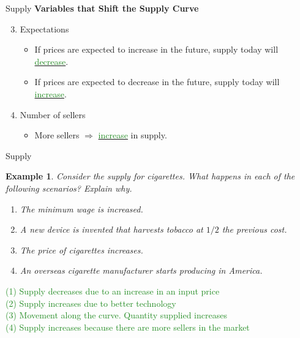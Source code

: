 \documentclass[xcolor={dvipsnames},pdf, hyperref={colorlinks=true, citecolor=ForestGreen, linkcolor=BlueViolet, urlcolor=Magenta}]{beamer}
\newtheorem{exmp}{Example}[section]
\theoremstyle{definition}
\newcommand{\ddp}[1]{{\textcolor{ForestGreen}{#1}}}
\newcommand{\dd}[1]{{\underline{\textcolor{ForestGreen}{#1}}}}
\begin{document}
\begin{frame}{Supply}
	\textbf{Variables that Shift the Supply Curve}
	\begin{enumerate}
			\setcounter{enumi}{2}	
		\item Expectations
		\begin{itemize}
			\item If prices are expected to increase in the future, supply today will \dd{decrease}.
			\item If prices are expected to decrease in the future, supply today will \dd{increase}.
		\end{itemize} 
		\item Number of sellers 
		\begin{itemize}
			\item More sellers $\Rightarrow$ \dd{increase} in supply.
		\end{itemize}
	\end{enumerate}
\end{frame}

\begin{frame}[t]{Supply}
	\begin{exmp}
		Consider the supply for cigarettes.  What happens in each of the following scenarios? Explain why.
		
		\begin{enumerate}
			\item The minimum wage is increased.
		
			
			\item	A new device is invented that harvests tobacco at $1/2$ the previous cost.
			
			\item 	The price of cigarettes increases.
			

			
			\item	An overseas cigarette manufacturer starts producing in America.
		
		\end{enumerate}
	\end{exmp}

\ddp{\pause (1) Supply decreases due to an increase in an input price \\
\pause (2) Supply increases due to better technology\\
\pause (3) Movement along the curve. Quantity supplied increases \\
\pause (4) Supply increases because there are more sellers in the market}
\end{frame}
\end{document}
